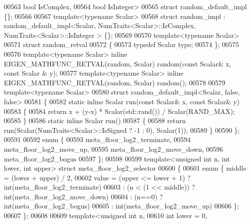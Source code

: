 \begin{DoxyCode}
00563          \textcolor{keywordtype}{bool} IsComplex,
00564          \textcolor{keywordtype}{bool} IsInteger>
00565 \textcolor{keyword}{struct }random\_default\_impl \{\};
00566 
00567 \textcolor{keyword}{template}<\textcolor{keyword}{typename} Scalar>
00568 \textcolor{keyword}{struct }random\_impl : random\_default\_impl<Scalar, NumTraits<Scalar>::IsComplex, NumTraits<Scalar>::IsInteger
      > \{\};
00569 
00570 \textcolor{keyword}{template}<\textcolor{keyword}{typename} Scalar>
00571 \textcolor{keyword}{struct }random\_retval
00572 \{
00573   \textcolor{keyword}{typedef} Scalar type;
00574 \};
00575 
00576 \textcolor{keyword}{template}<\textcolor{keyword}{typename} Scalar> \textcolor{keyword}{inline} EIGEN\_MATHFUNC\_RETVAL(random, Scalar) random(\textcolor{keyword}{const} Scalar& x, \textcolor{keyword}{const} Scalar
      & y);
00577 \textcolor{keyword}{template}<\textcolor{keyword}{typename} Scalar> \textcolor{keyword}{inline} EIGEN\_MATHFUNC\_RETVAL(random, Scalar) random();
00578 
00579 \textcolor{keyword}{template}<\textcolor{keyword}{typename} Scalar>
00580 \textcolor{keyword}{struct }random\_default\_impl<Scalar, false, false>
00581 \{
00582   \textcolor{keyword}{static} \textcolor{keyword}{inline} Scalar run(\textcolor{keyword}{const} Scalar& x, \textcolor{keyword}{const} Scalar& y)
00583   \{
00584     \textcolor{keywordflow}{return} x + (y-x) * Scalar(std::rand()) / Scalar(RAND\_MAX);
00585   \}
00586   \textcolor{keyword}{static} \textcolor{keyword}{inline} Scalar run()
00587   \{
00588     \textcolor{keywordflow}{return} run(Scalar(NumTraits<Scalar>::IsSigned ? -1 : 0), Scalar(1));
00589   \}
00590 \};
00591 
00592 \textcolor{keyword}{enum} \{
00593   meta\_floor\_log2\_terminate,
00594   meta\_floor\_log2\_move\_up,
00595   meta\_floor\_log2\_move\_down,
00596   meta\_floor\_log2\_bogus
00597 \};
00598 
00599 \textcolor{keyword}{template}<\textcolor{keywordtype}{unsigned} \textcolor{keywordtype}{int} n, \textcolor{keywordtype}{int} lower, \textcolor{keywordtype}{int} upper> \textcolor{keyword}{struct }meta\_floor\_log2\_selector
00600 \{
00601   \textcolor{keyword}{enum} \{ middle = (lower + upper) / 2,
00602          value = (upper <= lower + 1) ? int(meta\_floor\_log2\_terminate)
00603                : (n < (1 << middle)) ? int(meta\_floor\_log2\_move\_down)
00604                : (n==0) ? int(meta\_floor\_log2\_bogus)
00605                : int(meta\_floor\_log2\_move\_up)
00606   \};
00607 \};
00608 
00609 \textcolor{keyword}{template}<\textcolor{keywordtype}{unsigned} \textcolor{keywordtype}{int} n,
00610          \textcolor{keywordtype}{int} lower = 0,

\end{DoxyCode}
